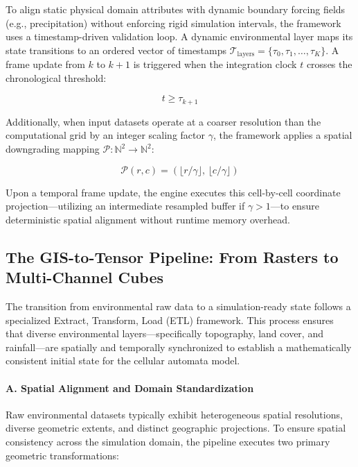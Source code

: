 To align static physical domain attributes with dynamic boundary forcing fields (e.g., precipitation) without enforcing rigid simulation intervals, the framework uses a timestamp-driven validation loop. A dynamic environmental layer maps its state transitions to an ordered vector of timestamps $\mathcal{T}_{\text{layers}} = \{ \tau_0, \tau_1, \dots, \tau_K \}$. A frame update from $k$ to $k+1$ is triggered when the integration clock $t$ crosses the chronological threshold:

\begin{equation}
    t \ge \tau_{k+1}
\end{equation}

Additionally, when input datasets operate at a coarser resolution than the computational grid by an integer scaling factor $\gamma$, the framework applies a spatial downgrading mapping $\mathcal{P}: \mathbb{N}^2 \rightarrow \mathbb{N}^2$:

\begin{equation}
    \mathcal{P}(r, c) = \left( \lfloor r / \gamma \rfloor, \, \lfloor c / \gamma \rfloor \right)
\end{equation}

Upon a temporal frame update, the engine executes this cell-by-cell coordinate projection—utilizing an intermediate resampled buffer if $\gamma > 1$—to ensure deterministic spatial alignment without runtime memory overhead.


\subsection{The GIS-to-Tensor Pipeline: From Rasters to Multi-Channel Cubes}

The transition from environmental raw data to a simulation-ready state follows a specialized Extract, Transform, Load (ETL) framework. 
This process ensures that diverse environmental layers—specifically topography, land cover, and rainfall—are spatially and temporally 
synchronized to establish a mathematically consistent initial state for the cellular automata model.

\paragraph{A. Spatial Alignment and Domain Standardization}

Raw environmental datasets typically exhibit heterogeneous spatial resolutions, diverse geometric extents, and distinct geographic 
projections. To ensure spatial consistency across the simulation domain, the pipeline executes two primary geometric transformations:

